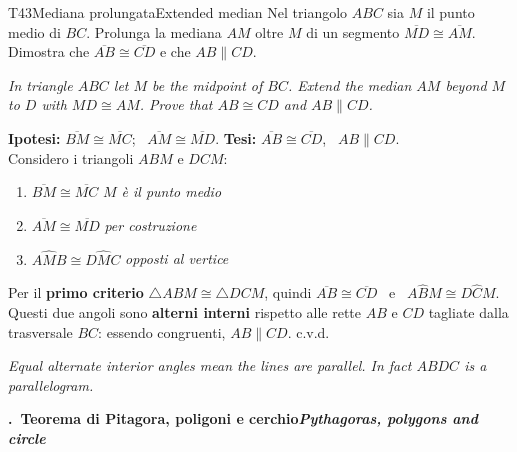 \documentclass[11pt,a4paper]{article}
\newcommand{\en}[1]{\par{\small\itshape\color{engray}#1\par}}
\newcommand{\ang}[3]{#1\widehat{#2}#3}
\newcommand{\seg}[1]{\overline{#1}}
\newcommand{\tri}[1]{\triangle #1}
\newcounter{sezione}
\newcommand{\sezione}[2]{%
  \par\addvspace{14pt}\Needspace{10\baselineskip}%
  \refstepcounter{sezione}%
  \noindent\begin{tcolorbox}[enhanced, colback=navy, colframe=navy, sharp corners,
      left=6pt, right=6pt, top=3pt, bottom=3pt, boxsep=0pt, before skip=0pt, after skip=6pt]
    {\color{white}\large\bfseries \thesezione.\ #1\hfill{\normalsize\itshape #2}}
  \end{tcolorbox}\par}
\begin{document}
\begin{esercizio}{T4}{3}{Mediana prolungata}{Extended median}
Nel triangolo $ABC$ sia $M$ il punto medio di $BC$. Prolunga la mediana $AM$ oltre $M$ di un segmento $\seg{MD}\cong\seg{AM}$. Dimostra che $\seg{AB}\cong\seg{CD}$ e che $AB\parallel CD$.
\en{In triangle $ABC$ let $M$ be the midpoint of $BC$. Extend the median $AM$ beyond $M$ to $D$ with $MD \cong AM$. Prove that $AB \cong CD$ and $AB \parallel CD$.}
\begin{center}
\end{center}
\end{esercizio}
\begin{solbox}
\textbf{Ipotesi:} $\seg{BM}\cong\seg{MC}$; \ $\seg{AM}\cong\seg{MD}$. \qquad \textbf{Tesi:} $\seg{AB}\cong\seg{CD}$, \ $AB\parallel CD$.\\
Considero i triangoli $ABM$ e $DCM$:
\begin{enumerate}[label=\arabic*.]
\item $\seg{BM}\cong\seg{MC}$ \hfill {\small\itshape $M$ è il punto medio}
\item $\seg{AM}\cong\seg{MD}$ \hfill {\small\itshape per costruzione}
\item $\ang{A}{M}{B}\cong\ang{D}{M}{C}$ \hfill {\small\itshape opposti al vertice}
\end{enumerate}
Per il \textbf{primo criterio} $\tri{ABM}\cong\tri{DCM}$, quindi $\seg{AB}\cong\seg{CD}$ \ e \ $\ang{A}{B}{M}\cong\ang{D}{C}{M}$.
Questi due angoli sono \textbf{alterni interni} rispetto alle rette $AB$ e $CD$ tagliate dalla trasversale $BC$: essendo congruenti, $AB\parallel CD$. \hfill c.v.d.
\en{Equal alternate interior angles mean the lines are parallel. In fact $ABDC$ is a parallelogram.}
\end{solbox}

\sezione{Teorema di Pitagora, poligoni e cerchio}{Pythagoras, polygons and circle}
\end{document}
